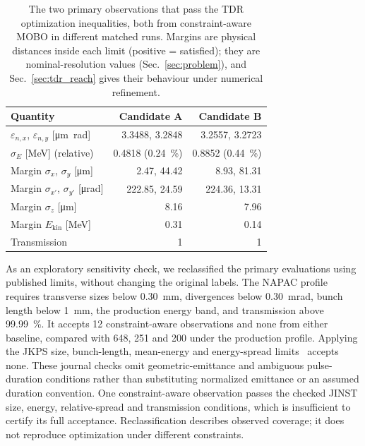 \documentclass[aps,prab,reprint,superscriptaddress,amsmath,amssymb,floatfix]{revtex4-2}
\newcommand{\enx}{\varepsilon_{n,x}}
\newcommand{\eny}{\varepsilon_{n,y}}
\begin{document}
\begin{table}[htbp]
\centering
\caption{The two primary observations that pass the TDR optimization inequalities, both from
constraint-aware MOBO in different matched runs. Margins are physical distances inside each
limit (positive = satisfied); they are nominal-resolution values
(Sec.~\ref{sec:problem}), and Sec.~\ref{sec:tdr_reach} gives their behaviour under
numerical refinement.}
\label{tab:tdr_candidates}
\small
\begin{tabular}{lrr}
\toprule
Quantity & Candidate A & Candidate B \\
\midrule
$\enx$, $\eny$ [\si{\micro\metre\radian}] & 3.3488, 3.2848 & 3.2557, 3.2723 \\
$\sigma_E$ [\si{\mega\electronvolt}] (relative) & 0.4818 (\SI{0.24}{\percent}) & 0.8852
(\SI{0.44}{\percent}) \\
Margin $\sigma_x$, $\sigma_y$ [\si{\micro\metre}] & 2.47, 44.42 & 8.93, 81.31 \\
Margin $\sigma_{x'}$, $\sigma_{y'}$ [\si{\micro\radian}] & 222.85, 24.59 & 224.36, 13.31 \\
Margin $\sigma_z$ [\si{\micro\metre}] & 8.16 & 7.96 \\
Margin $E_\mathrm{kin}$ [\si{\mega\electronvolt}] & 0.31 & 0.14 \\
Transmission & 1 & 1 \\
\bottomrule
\end{tabular}
\end{table}

As an exploratory sensitivity check, we reclassified the primary evaluations using published
limits, without changing the original labels. The NAPAC profile~\cite{Park2025NAPAC} requires
transverse sizes below \SI{0.30}{\milli\metre}, divergences below
\SI{0.30}{\milli\radian}, bunch length below \SI{1}{\milli\metre}, the production energy band,
and transmission above \SI{99.99}{\percent}. It accepts 12 constraint-aware observations and
none from either baseline, compared with 648, 251 and 200 under the production profile.
Applying the JKPS size, bunch-length, mean-energy and energy-spread limits~\cite{Kim2025KLSError}
accepts none. These journal checks omit geometric-emittance and ambiguous pulse-duration
conditions rather than substituting normalized emittance or an assumed duration convention.
One constraint-aware observation passes the checked JINST size, energy, relative-spread and
transmission conditions, which is insufficient to certify its full acceptance. Reclassification
describes observed coverage; it does not reproduce optimization under different constraints.
\end{document}
